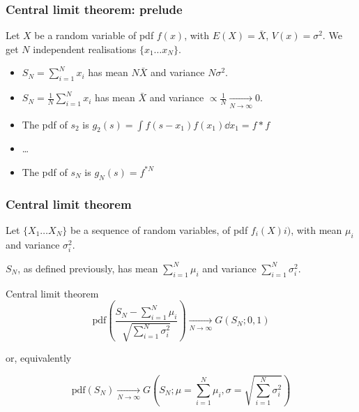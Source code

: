 \documentclass[9pt]{beamer}
\begin{document}
\begin{frame}
 \frametitle{Central limit theorem: prelude}
 
 Let $X$ be a random variable of pdf $f(x)$, with $E(X) = \bar{X}$, $V(x) = \sigma^2$. We get $N$ independent realisations $\{ x_1 \dots x_N \}$.
 
 \begin{itemize}
  \item $S_N = \sum_{i=1}^N x_i$ has mean $N \bar{X}$ and variance $N \sigma^2$.
  \item $S_N = \frac{1}{N} \sum_{i=1}^N x_i$ has mean $\bar{X}$ and variance $\propto \frac{1}{N} \xrightarrow[N\to\infty]{}0$.
 \end{itemize}

 \begin{itemize}
  \item The pdf of $s_2$ is $g_2(s) = \int f(s-x_1) f(x_1) \dd x_1 = f * f$
  \item \dots
  \item The pdf of $s_N$ is $g_N(s) = f^{*N}$
 \end{itemize}

\end{frame}

\begin{frame}
 \frametitle{Central limit theorem}
 
 Let $\{ X_1 \dots X_N\}$ be a sequence of random variables, of pdf $f_i(X)i)$, with mean $\mu_i$ and variance $\sigma_i^2$. 
 
 $S_N$, as defined previously, has mean $\sum_{i=1}^N \mu_i$ and variance $\sum_{i=1}^N \sigma_i^2$.
 
 \begin{block}{Central limit theorem}
  $$\text{pdf}\left(\frac{S_N - \sum_{i=1}^N \mu_i}{\sqrt{\sum_{i=1}^N \sigma_i^2}}\right) \xrightarrow[N\to\infty]{} G(S_N; 0,1)$$
  
  or, equivalently
  
  $$\text{pdf}(S_N) \xrightarrow[N\to\infty]{} G\left(S_N; \mu = \sum_{i=1}^N \mu_i,\sigma = \sqrt{\sum_{i=1}^N \sigma_i^2}\right)$$
 \end{block}

\end{frame}
\end{document}

